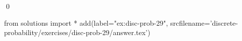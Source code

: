 
\begin{ex} 
  \label{ex:disc-prob-29}
  
  \qed
\end{ex} 
\begin{python0}
from solutions import *
add(label="ex:disc-prob-29",
    srcfilename='discrete-probability/exercises/disc-prob-29/answer.tex') 
\end{python0}
